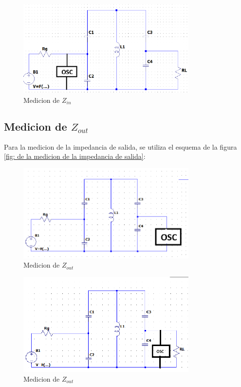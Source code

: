 \begin{figure}[h]
    \centering
    \includegraphics[width=0.8\textwidth]{Imagenes/medicion_zin.png}
    \caption{Medicion de $Z_{in}$}
    \label{fig: de la medicion de la impedancia de entrada}
\end{figure}



\subsection{Medicion de $Z_{out}$}

Para la medicion de la impedancia de salida, se utiliza el esquema de la figura \ref{fig: de la medicion de la impedancia de salida}:

\begin{figure}[h]
    \centering
    \includegraphics[width=0.8\textwidth]{Imagenes/medicion_zout1.png}
    \caption{Medicion de $Z_{out}$}
    \label{fig: Primer esquema de la medicion de la impedancia de salida}
\end{figure}

\begin{figure}[h]
    \centering
    \includegraphics[width=0.8\textwidth]{Imagenes/medicion_zout2.png}
    \caption{Medicion de $Z_{out}$}
    \label{fig: Segundo esquema de la medicion de la impedancia de salida}
\end{figure}